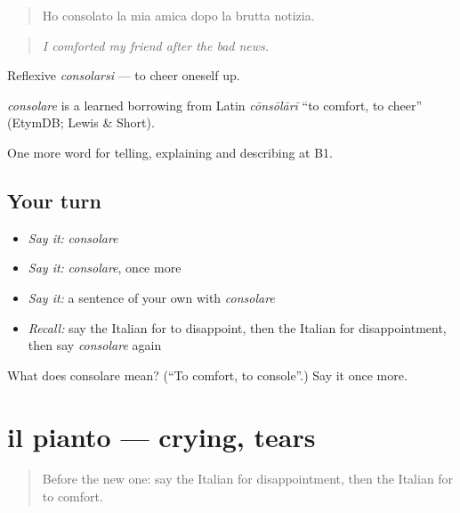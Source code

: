 \begin{quote}
Ho consolato la mia amica dopo la brutta notizia.
\end{quote}

\begin{quote}
\emph{I comforted my friend after the bad news.}
\end{quote}

Reflexive \emph{consolarsi} — to cheer oneself up.

\begin{cousinweb}
\emph{consolare} is a learned borrowing from Latin \emph{cōnsōlārī} \textquotedblleft{}to comfort, to cheer\textquotedblright{} (EtymDB; Lewis \& Short).
\end{cousinweb}

\begin{grammarlens}[title={What you've built}]
One more word for telling, explaining and describing at B1.
\end{grammarlens}

\subsection*{Your turn}
\begin{itemize}
\raggedright
  \item \emph{Say it:} \emph{consolare}
  \item \emph{Say it:} \emph{consolare}, once more
  \item \emph{Say it:} a sentence of your own with \emph{consolare}
  \item \emph{Recall:} say the Italian for to disappoint, then the Italian for disappointment, then say \emph{consolare} again
\end{itemize}

\begin{tcolorbox}[breakable,colback=teal!4,colframe=teal!35!black,title={Before you move on}]
What does consolare mean? (\textquotedblleft{}To comfort, to console\textquotedblright{}.) Say it once more.
\end{tcolorbox}
\section[il pianto]{il pianto — crying, tears}

\label{lesson:IT-C476-pianto}



\begin{quote}
Before the new one: say the Italian for disappointment, then the Italian for to comfort.
\end{quote}

